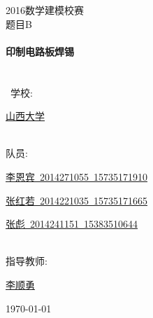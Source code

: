 \documentclass[fontset=windows,a4paper,12pt]{ctexart}
\begin{document}
\begin{titlepage} \begin{center} %
  \textsc{\LARGE 2016数学建模校赛}\\
  [1.5cm] \textsc{\Large 题目\quad B}\\
  [0.5cm]\ \\
  [0.4cm] { \huge \bfseries 印制电路板焊锡}\\[0.4cm]\ \\[1.5cm]\ \\[1.4cm]\ 
  \large {学\quad\quad 校:} 
  \begin{minipage}[t]{0.7\textwidth}
    \centering
    \uline{\hspace{6em}山西大学\hfill} \makebox[0.66em]{}\par
  \end{minipage}
  \\[0.6cm]
  \large {队\quad\quad 员:} 
  \begin{minipage}[t]{0.7\textwidth} 
    \uline{\hspace{3em}李恩宾\ 2014271055\ 15735171910\hfill} \makebox[0.66em]{}\par
    \uline{\hspace{3em}张红若\ 2014221035\ 15735171665\hfill} \makebox[0.66em]{}\par
    \uline{\hspace{3em}张彪\quad\ 2014241151\ 15383510644\hfill} \makebox[0.66em]{}\par
  \end{minipage}
  \\[0.6cm]
  \large {指导教师:} 
  \begin{minipage}[t]{0.7\textwidth}
    \centering
    \uline{\hspace{6em}李顺勇 \hfill} \makebox[0.66em]{}\par
  \end{minipage}
  \vfill %
  {\large \today} \end{center} \end{titlepage}
  \begin{center}
  \end{center}
  \linespread{1.2}
  \begin{center}
  \end{center}
\end{document}
